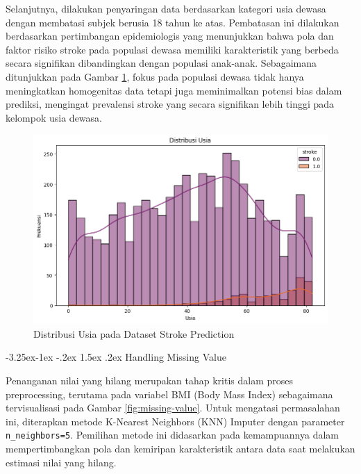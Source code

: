 \documentclass[10pt]{article}
\makeatletter
\renewcommand\subsubsection{\@startsection{subsubsection}{3}{\z@}%
  {-3.25ex\@plus -1ex \@minus -.2ex}%
  {1.5ex \@plus .2ex}%
  {\normalfont\itshape\normalsize}}
\makeatother
\begin{document}
\begin{multicols}{2}
    Selanjutnya, dilakukan penyaringan data berdasarkan kategori usia dewasa dengan
    membatasi subjek berusia 18 tahun ke atas. Pembatasan ini dilakukan berdasarkan
    pertimbangan epidemiologis yang menunjukkan bahwa pola dan faktor risiko stroke
    pada populasi dewasa memiliki karakteristik yang berbeda secara signifikan
    dibandingkan dengan populasi anak-anak. Sebagaimana ditunjukkan pada Gambar
    \ref{fig:age-distribution}, fokus pada populasi dewasa tidak hanya meningkatkan
    homogenitas data tetapi juga meminimalkan potensi bias dalam prediksi,
    mengingat prevalensi stroke yang secara signifikan lebih tinggi pada kelompok
    usia dewasa.

    \begin{figure}[H]
        \includegraphics[width=\columnwidth]{./assets/age-distribution.png}
        \caption{Distribusi Usia pada Dataset Stroke Prediction}%
        \label{fig:age-distribution}
    \end{figure}

    \subsubsection{Handling Missing Value}

    Penanganan nilai yang hilang merupakan tahap kritis dalam proses preprocessing,
    terutama pada variabel BMI (Body Mass Index) sebagaimana tervisualisasi pada
    Gambar \ref{fig:missing-value}. Untuk mengatasi permasalahan ini, diterapkan
    metode K-Nearest Neighbors (KNN) Imputer dengan parameter
    \texttt{n\_neighbors=5}. Pemilihan metode ini didasarkan pada kemampuannya
    dalam mempertimbangkan pola dan kemiripan karakteristik antara data saat
    melakukan estimasi nilai yang hilang.


\end{multicols}
\end{document}
